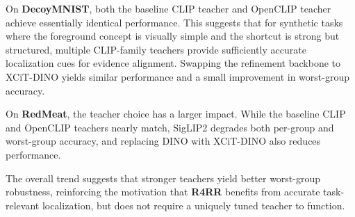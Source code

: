 \documentclass[10pt,twocolumn,letterpaper]{article}
\begin{document}
On \textbf{DecoyMNIST}, both the baseline CLIP teacher and OpenCLIP teacher achieve essentially identical performance. This suggests that for synthetic tasks where the foreground concept is visually simple and the shortcut is strong but structured, multiple CLIP-family teachers provide sufficiently accurate localization cues for evidence alignment. Swapping the refinement backbone to XCiT-DINO yields similar performance and a small improvement in worst-group accuracy.

On \textbf{RedMeat}, the teacher choice has a larger impact. While the baseline CLIP and OpenCLIP teachers nearly match, SigLIP2 degrades both per-group and worst-group accuracy, and replacing DINO with XCiT-DINO also reduces performance.

The overall trend suggests that stronger teachers yield better worst-group robustness, reinforcing the motivation that \textbf{R4RR} benefits from accurate task-relevant localization, but does not require a uniquely tuned teacher to function.




\end{document}
